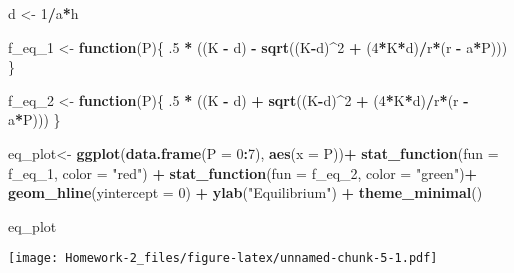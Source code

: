 \documentclass[]{article}
\newenvironment{Shaded}{\begin{snugshade}}{\end{snugshade}}
\newcommand{\KeywordTok}[1]{\textcolor[rgb]{0.13,0.29,0.53}{\textbf{#1}}}
\newcommand{\DataTypeTok}[1]{\textcolor[rgb]{0.13,0.29,0.53}{#1}}
\newcommand{\DecValTok}[1]{\textcolor[rgb]{0.00,0.00,0.81}{#1}}
\newcommand{\StringTok}[1]{\textcolor[rgb]{0.31,0.60,0.02}{#1}}
\newcommand{\ControlFlowTok}[1]{\textcolor[rgb]{0.13,0.29,0.53}{\textbf{#1}}}
\newcommand{\OperatorTok}[1]{\textcolor[rgb]{0.81,0.36,0.00}{\textbf{#1}}}
\newcommand{\NormalTok}[1]{#1}
\begin{document}
\begin{Shaded}
\begin{Highlighting}[]
\NormalTok{d <-}\StringTok{ }\DecValTok{1}\OperatorTok{/}\NormalTok{a}\OperatorTok{*}\NormalTok{h}

\NormalTok{f_eq_}\DecValTok{1}\NormalTok{ <-}\StringTok{ }\ControlFlowTok{function}\NormalTok{(P)\{}
\NormalTok{  .}\DecValTok{5} \OperatorTok{*}\StringTok{ }\NormalTok{((K }\OperatorTok{-}\StringTok{ }\NormalTok{d) }\OperatorTok{-}\StringTok{ }\KeywordTok{sqrt}\NormalTok{((K}\OperatorTok{-}\NormalTok{d)}\OperatorTok{^}\DecValTok{2} \OperatorTok{+}\StringTok{ }\NormalTok{(}\DecValTok{4}\OperatorTok{*}\NormalTok{K}\OperatorTok{*}\NormalTok{d)}\OperatorTok{/}\NormalTok{r}\OperatorTok{*}\NormalTok{(r }\OperatorTok{-}\StringTok{ }\NormalTok{a}\OperatorTok{*}\NormalTok{P)))}
\NormalTok{\}}

\NormalTok{f_eq_}\DecValTok{2}\NormalTok{ <-}\StringTok{ }\ControlFlowTok{function}\NormalTok{(P)\{}
\NormalTok{  .}\DecValTok{5} \OperatorTok{*}\StringTok{ }\NormalTok{((K }\OperatorTok{-}\StringTok{ }\NormalTok{d) }\OperatorTok{+}\StringTok{ }\KeywordTok{sqrt}\NormalTok{((K}\OperatorTok{-}\NormalTok{d)}\OperatorTok{^}\DecValTok{2} \OperatorTok{+}\StringTok{ }\NormalTok{(}\DecValTok{4}\OperatorTok{*}\NormalTok{K}\OperatorTok{*}\NormalTok{d)}\OperatorTok{/}\NormalTok{r}\OperatorTok{*}\NormalTok{(r }\OperatorTok{-}\StringTok{ }\NormalTok{a}\OperatorTok{*}\NormalTok{P)))}
\NormalTok{\}}


\NormalTok{eq_plot<-}\StringTok{ }\KeywordTok{ggplot}\NormalTok{(}\KeywordTok{data.frame}\NormalTok{(}\DataTypeTok{P =} \DecValTok{0}\OperatorTok{:}\DecValTok{7}\NormalTok{), }\KeywordTok{aes}\NormalTok{(}\DataTypeTok{x =}\NormalTok{ P))}\OperatorTok{+}\StringTok{ }
\StringTok{  }\KeywordTok{stat_function}\NormalTok{(}\DataTypeTok{fun =}\NormalTok{ f_eq_}\DecValTok{1}\NormalTok{, }\DataTypeTok{color =} \StringTok{"red"}\NormalTok{) }\OperatorTok{+}
\StringTok{  }\KeywordTok{stat_function}\NormalTok{(}\DataTypeTok{fun =}\NormalTok{ f_eq_}\DecValTok{2}\NormalTok{, }\DataTypeTok{color =} \StringTok{"green"}\NormalTok{)}\OperatorTok{+}
\StringTok{  }\KeywordTok{geom_hline}\NormalTok{(}\DataTypeTok{yintercept =} \DecValTok{0}\NormalTok{) }\OperatorTok{+}
\StringTok{  }\KeywordTok{ylab}\NormalTok{(}\StringTok{"Equilibrium"}\NormalTok{) }\OperatorTok{+}\StringTok{ }
\StringTok{  }\KeywordTok{theme_minimal}\NormalTok{()}

\NormalTok{eq_plot}
\end{Highlighting}
\end{Shaded}

\texttt{[image: Homework-2\_files/figure-latex/unnamed-chunk-5-1.pdf]}
\end{document}
